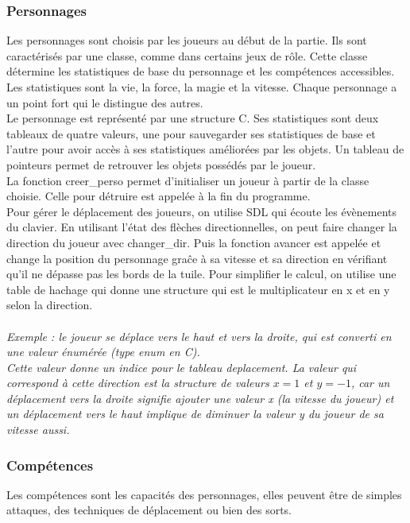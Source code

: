 \documentclass[11pt]{article}
\begin{document}
            \subsubsection{Personnages}
            Les personnages sont choisis par les joueurs au début de la partie. Ils sont caractérisés par une classe, comme dans certains jeux de rôle. 
            Cette classe détermine les statistiques de base du personnage et les compétences accessibles. Les statistiques sont la vie, la force, la magie et la vitesse. 
            Chaque personnage a un point fort qui le distingue des autres.\\
            Le personnage est représenté par une structure C. Ses statistiques  sont deux tableaux de quatre valeurs, 
            une pour sauvegarder ses statistiques de base et l'autre pour avoir accès à ses statistiques améliorées par les objets. 
            Un tableau de pointeurs permet de retrouver les objets possédés par le joueur.\\
            La fonction creer\_perso permet d’initialiser un joueur à partir de la classe choisie.
            Celle pour détruire est appelée à la fin du programme.\\
            Pour gérer le déplacement des joueurs, on utilise SDL qui écoute les évènements du clavier. 
            En utilisant l’état des flèches directionnelles, on peut faire changer la direction du joueur avec changer\_dir. 
            Puis la fonction avancer est appelée et change la position du personnage graĉe à sa vitesse et sa direction en vérifiant qu’il ne dépasse pas les bords de la tuile. 
            Pour simplifier le calcul, on utilise une table de hachage qui donne une structure qui est le multiplicateur en x et en y selon la direction. \\\\
            \textit{
                Exemple : le joueur se déplace vers le haut et vers la droite, qui est converti en une valeur énumérée (type enum en C). \\
                Cette valeur donne un indice pour le tableau deplacement. La valeur qui correspond à cette direction est la structure de valeurs $x=1$ et $y=-1$, 
                car un déplacement vers la droite signifie ajouter une valeur x (la vitesse du joueur) 
                et un déplacement vers le haut implique de diminuer la valeur y du joueur de sa vitesse aussi.
            }
            \subsubsection{Compétences}
            Les compétences sont les capacités des personnages, elles peuvent être de simples attaques, des techniques de déplacement ou bien des sorts.
\end{document}
